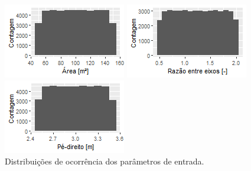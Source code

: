 \documentclass{article}
\begin{document}
\begin{figure}[h!]
	\caption{Distribuições de ocorrência dos parâmetros de entrada.} %
	\label{fig:db_hist}
	\centering
	\begin{minipage}{.33\textwidth}
		\centering
		\includegraphics[width=\linewidth]{plot_area.png}
	\end{minipage}%
	\begin{minipage}{.33\textwidth}
		\centering
		\includegraphics[width=\linewidth]{plot_ratio.png}
	\end{minipage}%
	\begin{minipage}{.33\textwidth}
		\centering
		\includegraphics[width=\linewidth]{plot_height.png}

\end{minipage}
\end{figure}
\end{document}
